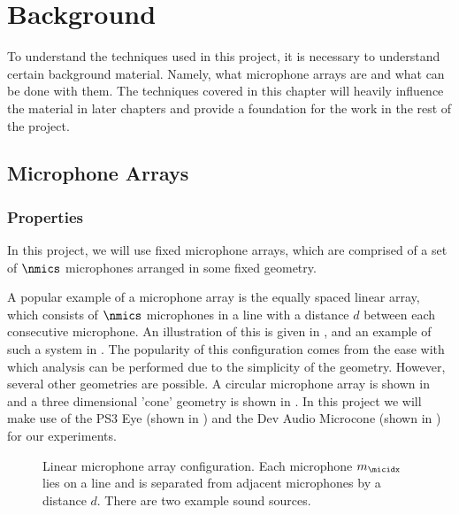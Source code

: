 \documentclass{uiucecethesis09}
\begin{document}
\chapter{Background}
  \label{chap:background}

  To understand the techniques used in this project, it is necessary to 
  understand certain background material. Namely, what microphone arrays are and 
  what can be done with them. The techniques covered in this chapter will 
  heavily influence the material in later chapters and provide a foundation for 
  the work in the rest of the project.

  \section{Microphone Arrays}

    \subsection{Properties}
      In this project, we will use fixed microphone arrays, which are comprised 
      of a set of $\nmics$ microphones arranged in some fixed geometry. 

      A popular example of a microphone array is the equally spaced linear 
      array, which consists of $\nmics$ microphones in a line with a distance 
      $d$ between each consecutive microphone. An illustration of this is given 
      in , and an example of such a system in 
      .  The popularity of this configuration comes from the 
      ease with which analysis can be performed due to the simplicity of the 
      geometry.  However, several other geometries are possible. A circular 
      microphone array is shown in  and a three 
      dimensional 'cone' geometry is shown in . In this 
      project we will make use of the PS3 Eye (shown in ) 
      and the Dev Audio Microcone (shown in ) for our 
      experiments.

      \begin{figure}[bottom]
        \begin{center}
          
        \end{center}
        \caption{Linear microphone array configuration. Each microphone $m_\micidx$ 
        lies on a line and is separated from adjacent microphones by a distance 
      $d$.  There are two example sound sources.}
        \label{fig:lin_mic_array}
      \end{figure}
\end{document}
